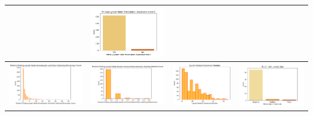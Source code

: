 \begin{center}
\begin{tabular}{ |c|c|c|c| }
		& \includegraphics[width=.25\textwidth]{NOTEBOOK/IMAGENES_CRUDAS/52} 
		\\  \hline
		\includegraphics[width=.25\textwidth]{NOTEBOOK/IMAGENES_CRUDAS/53} 
		& \includegraphics[width=.25\textwidth]{NOTEBOOK/IMAGENES_CRUDAS/54} 
		& \includegraphics[width=.25\textwidth]{NOTEBOOK/IMAGENES_CRUDAS/55} 
		& \includegraphics[width=.25\textwidth]{NOTEBOOK/IMAGENES_CRUDAS/56} 
		\\  \hline         
	\end{tabular} 
\end{center} 



